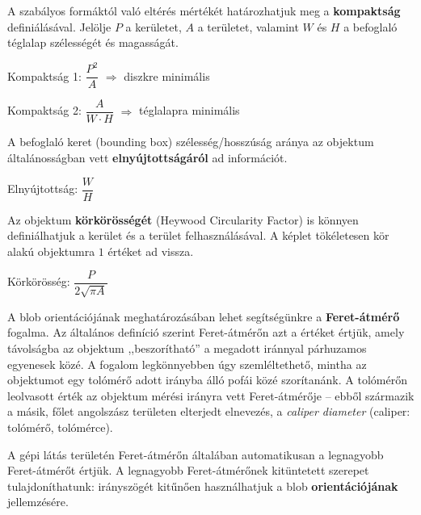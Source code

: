 \bigskip

A szabályos formáktól való eltérés mértékét határozhatjuk meg a \textbf{kompaktság} definiálásával. Jelölje $P$ a kerületet, $A$ a területet, valamint $W$ és $H$ a befoglaló téglalap szélességét és magasságát.

\begin{definition}{Kompaktság 1:}
$\dfrac{P^2}{A}$ $\Longrightarrow$ diszkre minimális
\end{definition}

\begin{definition}{Kompaktság 2:}
$\dfrac{A}{W \cdot H}$ $\Longrightarrow$ téglalapra minimális
\end{definition}

\bigskip

A befoglaló keret (bounding box) szélesség/hosszúság aránya az objektum általánosságban vett \textbf{elnyújtottságáról} ad információt. 

\begin{definition}{Elnyújtottság:}
$\dfrac{W}{H}$
\end{definition}

\bigskip

Az objektum \textbf{körkörösségét} (Heywood Circularity Factor) is könnyen definiálhatjuk a kerület és a terület felhasználásával. A képlet tökéletesen kör alakú objektumra $1$ értéket ad vissza.

\begin{definition}{Körkörösség:}
$\dfrac{P}{2 \sqrt{\pi A}}$
\end{definition}

\bigskip

A blob orientációjának meghatározásában lehet segítségünkre a \textbf{Feret-átmérő} fogalma. Az általános definíció szerint Feret-átmérőn azt a értéket értjük, amely távolságba az objektum ,,beszorítható'' a megadott iránnyal párhuzamos egyenesek közé. A fogalom legkönnyebben úgy szemléltethető, mintha az objektumot egy tolómérő adott irányba álló pofái közé szorítanánk. A tolómérőn leolvasott érték az objektum mérési irányra vett Feret-átmérője -- ebből származik a másik, főlet angolszász területen elterjedt elnevezés, a \emph{caliper diameter} (caliper: tolómérő, tolómérce). 

A gépi látás területén Feret-átmérőn általában automatikusan a legnagyobb Feret-átmérőt értjük. A legnagyobb Feret-átmérőnek kitüntetett szerepet tulajdoníthatunk: irányszögét kitűnően használhatjuk a blob \textbf{orientációjának} jellemzésére.

